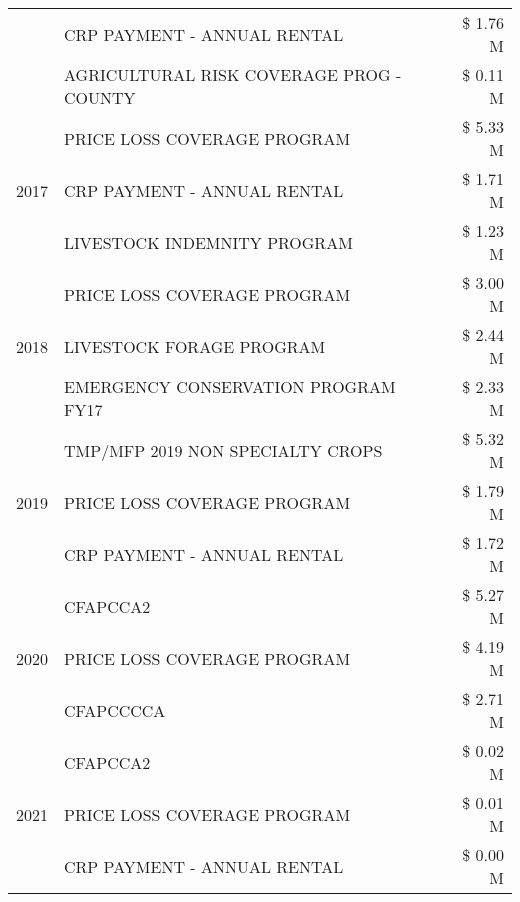 \begin{tabular}{llr}
 & CRP PAYMENT - ANNUAL RENTAL & \$ 1.76 M \\
 & AGRICULTURAL RISK COVERAGE PROG - COUNTY & \$ 0.11 M \\
\cline{1-3}
\multirow[t]{3}{*}{2017} & PRICE LOSS COVERAGE PROGRAM & \$ 5.33 M \\
 & CRP PAYMENT - ANNUAL RENTAL & \$ 1.71 M \\
 & LIVESTOCK INDEMNITY PROGRAM & \$ 1.23 M \\
\cline{1-3}
\multirow[t]{3}{*}{2018} & PRICE LOSS COVERAGE PROGRAM & \$ 3.00 M \\
 & LIVESTOCK FORAGE PROGRAM & \$ 2.44 M \\
 & EMERGENCY CONSERVATION PROGRAM FY17 & \$ 2.33 M \\
\cline{1-3}
\multirow[t]{3}{*}{2019} & TMP/MFP 2019 NON SPECIALTY CROPS & \$ 5.32 M \\
 & PRICE LOSS COVERAGE PROGRAM & \$ 1.79 M \\
 & CRP PAYMENT - ANNUAL RENTAL & \$ 1.72 M \\
\cline{1-3}
\multirow[t]{3}{*}{2020} & CFAPCCA2 & \$ 5.27 M \\
 & PRICE LOSS COVERAGE PROGRAM & \$ 4.19 M \\
 & CFAPCCCCA & \$ 2.71 M \\
\cline{1-3}
\multirow[t]{3}{*}{2021} & CFAPCCA2 & \$ 0.02 M \\
 & PRICE LOSS COVERAGE PROGRAM & \$ 0.01 M \\
 & CRP PAYMENT - ANNUAL RENTAL & \$ 0.00 M \\
\cline{1-3}
\bottomrule
\end{tabular}
